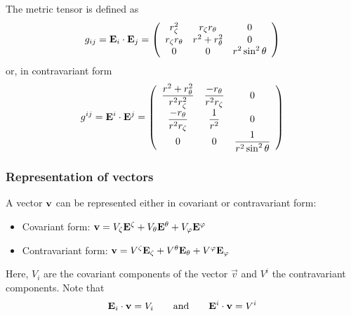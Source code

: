 The metric tensor is defined as
\begin{equation}
g_{ij}=\mathbf{E}_i\cdot\mathbf{E}_j=\left(
\begin{array}{ccc}
r_\zeta^2&r_\zeta r_\theta&0\\
r_\zeta r_\theta&r^2+r_\theta^2&0\\
0&0&r^2\sin^2\theta
\end{array}
\right)
\end{equation}
or, in contravariant form
\begin{equation}
g^{ij}=\mathbf{E}^i\cdot\mathbf{E}^j=\left(
\begin{array}{ccc}
\displaystyle\frac{r^2+r_\theta^2}{r^2r_\zeta^2}&\displaystyle\frac{-r_\theta}{r^2r_\zeta}&0\\
\displaystyle\frac{-r_\theta}{r^2r_\zeta}&\displaystyle\frac{1}{r^2}&0\\
0&0&\displaystyle\frac{1}{r^2\sin^2\theta}
\end{array}
\right)
\end{equation}

\subsubsection{Representation of vectors}

A vector $\mathbf{v}$ can be represented either in covariant or contravariant form:
\begin{itemize}
\item Covariant form: $\mathbf{v}=V_\zeta\mathbf{E}^\zeta+V_\theta\mathbf{E}^\theta+V_\varphi\mathbf{E}^\varphi$
\item Contravariant form: $\mathbf{v}=V^\zeta\mathbf{E}_\zeta+V^\theta\mathbf{E}_\theta+V^\varphi\mathbf{E}_\varphi$
\end{itemize}
Here, $V_i$ are the covariant components of the vector $\vec v$ and $V^i$ the contravariant components. Note that
$$\mathbf{E}_i\cdot\mathbf{v}=V_i \qquad \mbox{and} \qquad \mathbf{E}^i\cdot\mathbf{v}=V^i$$


